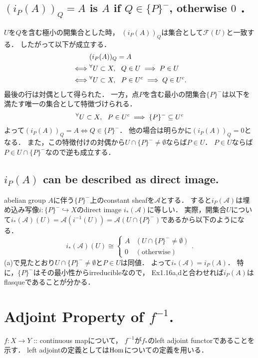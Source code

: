 \documentclass[a4paper]{jsarticle}
\newcommand{\shA}{\mathcal{A}}
\newcommand{\shF}{\mathcal{F}}
\begin{document}
    \subsection{$(i_P(A))_Q=A$ is $A$ if $Q \in \{P\}^-$, otherwise $0$ ．}
    $U$を$Q$を含む極小の開集合とした時，
    $(i_P(A))_Q$は集合として$\shF(U)$と一致する．
    したがって以下が成立する．
    \begin{align*}
        {}& (i_P(A))_Q=A \\
        \iff& {}^{\forall} U \subset X,~~ Q \in U \implies P \in U \\
        \iff& {}^{\forall} U \subset X,~~ P \in U^c \implies Q \in U^c.
    \end{align*}
    最後の行は対偶として得られた．
    一方，点$P$を含む最小の閉集合$\{P\}^-$は以下を満たす唯一の集合として特徴づけられる．
    \[ {}^{\forall} U \subset X,~~ P \in U^c \implies \{P\}^- \subseteq U^c \]
    よって$(i_P(A))_Q=A \iff Q \in \{P\}^-$．
    他の場合は明らかに$(i_P(A))_Q=0$となる．
    また，この特徴付けの対偶から$U \cap \{P\}^- \neq \emptyset$ならば$P \in U$．
    $P \in U$ならば$P \in U \cap \{P\}^-$なので逆も成立する．

    \subsection{$i_P(A)$ can be described as direct image.}
    abelian group $A$に伴う$\{P\}^-$上のconstant sheafを$\shA$とする．
    すると$i_P(\shA)$は埋め込み写像$i: \{P\}^- \hookrightarrow X$のdirect image $i_*(\shA)$に等しい．
    実際，開集合$U$について$i_*(\shA)(U)=\shA(i^{-1}(U))=\shA(U \cap \{P\}^-)$であるから以下のようになる．
    \[
        i_*(\shA)(U) \cong
        \begin{cases}{}
            A & (U \cap \{P\}^- \neq \emptyset) \\
            0 & (\text{otherwise})
        \end{cases}.
    \]
    (a)で見たとおり$U \cap \{P\}^- \neq \emptyset$と$P \in U$は同値．
    よって$i_*(\shA)=i_P(A)$．
    特に，$\{P\}^-$はその最小性からirreducibleなので，
    Ex1.16a,dと合わせれば$i_P(A)$はflasqueであることが分かる．

\section{Adjoint Property of $f^{-1}$.} %
    $f: X \to Y$ :: continuous mapについて，
    $f^{-1}$が$f_*$のleft adjoint functorであることを示す．
    left adjointの定義としては$\operatorname{Hom}$についての定義を用いる．
\end{document}

